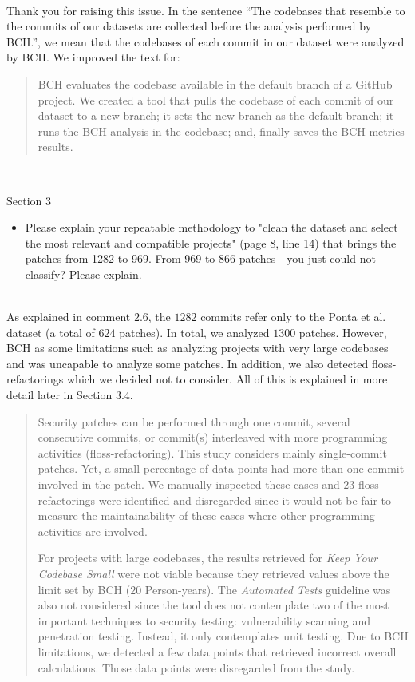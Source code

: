 \documentclass[11pt,fleqn]{article}
\newcommand{\eline}{\vspace*{.75\baselineskip}}
\newcommand{\Referee}[1]{\eline \noindent {\bf Reviewer comment #1:} \\}
\newcommand{\Us}{\eline \noindent {\bf Response:}\\}
\newenvironment{revcomment}[1][]
{\Referee{#1}\begin{rcomment}}
{\end{rcomment}}
\begin{document}
\Us Thank you for raising this issue. In the sentence ``The codebases that resemble to the commits of our datasets 
are collected before the analysis performed by BCH.'', we mean that the codebases of each commit in 
our dataset were analyzed by BCH. We improved the text for:

\begin{quote}
    BCH evaluates the codebase available in the default branch of a GitHub project. 
  We created a tool that pulls the codebase of each commit of our dataset 
  to a new branch; it sets the new branch as the default branch; it runs 
  the BCH analysis in the codebase; and, finally saves the BCH metrics
  results.
\end{quote}

\begin{revcomment}[2.9]
    Section 3\\
    \begin{itemize}
        \item Please explain your repeatable methodology to "clean the dataset and select the most relevant and 
        compatible projects" (page 8, line 14) that brings the patches from 1282 to 969.  From 969 to 866 patches - 
        you just could not classify?  Please explain.
    \end{itemize}
\end{revcomment}

\Us As explained in comment $2.6$, the $1282$ commits refer only to the Ponta et al. dataset (a total of $624$ 
patches). In total, we analyzed $1300$ patches. However, BCH as some limitations such as
analyzing projects with very large codebases and was uncapable to analyze some patches. In addition,
we also detected floss-refactorings which we decided not to consider. All of this is explained
in more detail later in Section 3.4. 

\begin{quote}
    Security patches can be performed through one commit, 
several consecutive commits, or commit(s) interleaved with more 
programming activities (floss-refactoring). This study considers 
mainly single-commit patches. Yet, a small percentage of data points 
had more than one commit involved in the patch. We manually 
inspected these cases and $23$ floss-refactorings were identified 
and disregarded since it would not be fair to measure the 
maintainability of these cases where other programming activities 
are involved.

For projects with large codebases, the results retrieved for 
\emph{Keep Your Codebase Small} were not viable because they 
retrieved values above the limit set by BCH ($20$ Person-years). The 
\emph{Automated Tests} guideline was also not considered since the 
tool does not contemplate two of the most important techniques to 
security testing: vulnerability scanning and penetration testing. 
Instead, it only contemplates unit testing. Due to BCH limitations, 
we detected a few data points that retrieved incorrect overall 
calculations. Those data points were disregarded from the study.
\end{quote}
\end{document}
